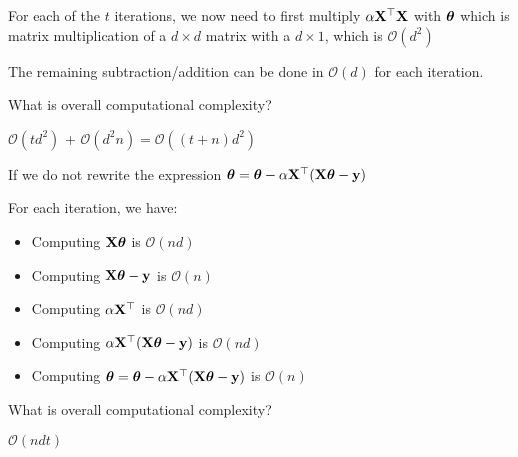 \documentclass[usenames,dvipsnames]{beamer}
\begin{document}
\begin{frame}For each of the $t$ iterations, we now need to first multiply $\alpha \mathbf{X}^{\top}\mathbf{X}$ with $\boldsymbol{\theta}$ which is matrix multiplication of a $d \times d$ matrix with a $d \times 1$, which is $\mathcal{O}(d^2)$ 

\pause The remaining subtraction/addition can be done in $\mathcal{O}(d)$ for each iteration.

\pause What is overall computational complexity?

\pause $\mathcal{O}(td^2)$ + $\mathcal{O}(d^2n) = \mathcal{O}((t+n)d^2)$
\end{frame}

\begin{frame}If we do not rewrite the expression
\(\boldsymbol{\theta}=\boldsymbol{\theta} - \alpha \mathbf{X}^{\top}(\mathbf{X} \boldsymbol{\theta}-\mathbf{y})\) 

For each iteration, we have:
\begin{itemize}
\item Computing $\mathbf{X}\boldsymbol{\theta}$ is $\mathcal{O}(nd)$
	\item Computing $\mathbf{X}\boldsymbol{\theta} - \mathbf{y}$ is $\mathcal{O}(n)$
	\pause
\item Computing $\alpha \mathbf{X}^{\top}$ is $\mathcal{O}(nd)$
	\item Computing $\alpha \mathbf{X}^{\top}(\mathbf{X}\boldsymbol{\theta} - \mathbf{y})$ is $\mathcal{O}(nd)$
	\item Computing \(\boldsymbol{\theta}=\boldsymbol{\theta} - \alpha \mathbf{X}^{\top}(\mathbf{X} \boldsymbol{\theta}-\mathbf{y})\) is $\mathcal{O}(n)$
\end{itemize}

\pause What is overall computational complexity?

\pause $\mathcal{O}(ndt)$
\end{frame}
\end{document}
